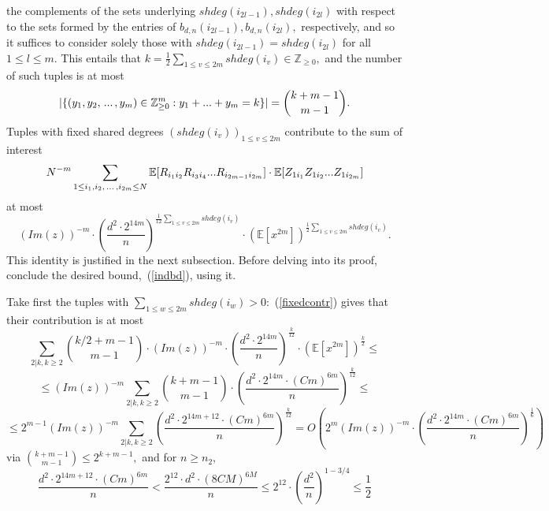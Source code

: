 \documentclass{article}
\numberwithin{equation}{section}
\begin{document}
the complements of the sets underlying \(shdeg(i_{2l-1}),shdeg(i_{2l})\) with respect to the sets formed by the entries of \(b_{d,n}(i_{2l-1}),b_{d,n}(i_{2l}),\) respectively,
and so it suffices to consider solely those with \(shdeg(i_{2l-1})= shdeg(i_{2l})\) for all \(1 \leq l \leq m.\) This entails that \(k=\frac{1}{2}\sum_{1 \leq v \leq 2m}{shdeg(i_v)} \in \mathbb{Z}_{\geq 0},\) and the number of such tuples is at most 
\[|\{(y_1,y_2,\hspace{0.05cm}...\hspace{0.05cm},y_m) \in \mathbb{Z}_{\geq 0}^m:y_1+...+y_m=k\}|=\binom{k+m-1}{m-1}.\] 
Tuples with fixed shared degrees \((shdeg(i_v))_{1 \leq v \leq 2m}\) contribute to the sum of interest
\[N^{-m}\sum_{1 \leq i_1,i_2,\hspace{0.05cm}...\hspace{0.05cm},i_{2m} \leq N}{\mathbb{E}[R_{i_1i_2}R_{i_3i_4}...R_{i_{2m-1}i_{2m}}] \cdot \mathbb{E}[Z_{1i_1}Z_{1i_2}...Z_{1i_{2m}}]}\]
at most
\begin{equation}\tag{\(fshdeg\)}\label{fixedcontr}
    (Im(z))^{-m} \cdot (\frac{d^2 \cdot 2^{14m}}{n})^{\frac{1}{12}\sum_{1 \leq v \leq 2m}{shdeg(i_v)}} \cdot (\mathbb{E}[x^{2m}])^{\frac{1}{2}\sum_{1 \leq v \leq 2m}{shdeg(i_v)}}.
\end{equation}
This identity is justified in the next subsection. Before delving into its proof, conclude the desired bound,~(\ref{indbd}), using it. 
\par
Take first the tuples with \(\sum_{1 \leq w \leq 2m}{shdeg(i_w)}>0:\) (\ref{fixedcontr}) gives that their contribution is at most
\[\sum_{2|k, k \geq 2}{\binom{k/2+m-1}{m-1} \cdot (Im(z))^{-m} \cdot (\frac{d^2 \cdot 2^{14m}}{n})^{\frac{k}{12}} \cdot (\mathbb{E}[x^{2m}])^{\frac{k}{2}}} \leq\]
\[\leq (Im(z))^{-m} \sum_{2|k, k \geq 2}{\binom{k+m-1}{m-1} \cdot (\frac{d^2 \cdot 2^{14m} \cdot (Cm)^{6m}}{n})^{\frac{k}{12}}} \leq\]
\begin{equation}\tag{\(T1\)}\label{t1}
    \leq 2^{m-1}(Im(z))^{-m}\sum_{2|k, k \geq 2}{(\frac{d^2 \cdot 2^{14m+12} \cdot (Cm)^{6m}}{n})^{\frac{k}{12}}}=O(2^{m}(Im(z))^{-m} \cdot (\frac{d^2 \cdot 2^{14m} \cdot (Cm)^{6m}}{n})^{\frac{1}{6}})
\end{equation}
via \(\binom{k+m-1}{m-1} \leq 2^{k+m-1},\) and for \(n \geq n_2,\)
\begin{equation}\label{small}
    \frac{d^2 \cdot 2^{14m+12} \cdot (Cm)^{6m}}{n} <\frac{2^{12} \cdot d^2 \cdot (8CM)^{6M}}{n} \leq  2^{12} \cdot (\frac{d^2}{n})^{1-3/4} \leq \frac{1}{2}
\end{equation}
\end{document}
